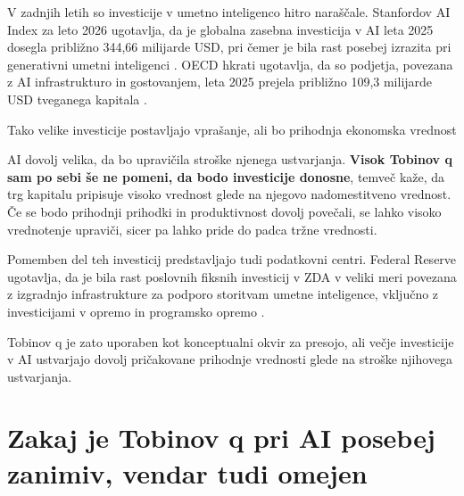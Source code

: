 \documentclass[12pt,a4paper]{article}
\begin{document}
V zadnjih letih so investicije v umetno inteligenco hitro naraščale. Stanfordov AI Index 
za leto 2026 ugotavlja, da je globalna zasebna investicija v AI leta 2025 dosegla približno 
344,66 milijarde USD, pri čemer je bila rast posebej izrazita pri generativni umetni 
inteligenci \citep{StanfordAIIndex2026}. OECD hkrati ugotavlja, da so podjetja, povezana 
z AI infrastrukturo in gostovanjem, leta 2025 prejela približno 109,3 milijarde USD 
tveganega kapitala \citep{OECD2026}.

Tako velike investicije postavljajo vprašanje, ali bo prihodnja ekonomska vrednost 

AI dovolj velika, da bo upravičila stroške njenega ustvarjanja. \textbf{Visok Tobinov q sam po sebi še ne pomeni, da bodo investicije donosne}, temveč kaže, da trg kapitalu 
pripisuje visoko vrednost glede na njegovo nadomestitveno vrednost. Če se bodo prihodnji 
prihodki in produktivnost dovolj povečali, se lahko visoko vrednotenje upraviči, sicer pa 
lahko pride do padca tržne vrednosti.

Pomemben del teh investicij predstavljajo tudi podatkovni centri. Federal Reserve 
ugotavlja, da je bila rast poslovnih fiksnih investicij v ZDA v veliki meri povezana 
z izgradnjo infrastrukture za podporo storitvam umetne inteligence, vključno z 
investicijami v opremo in programsko opremo \citep{FederalReserve2026}.

Tobinov q je zato uporaben kot konceptualni okvir za presojo, ali večje investicije v 
AI ustvarjajo dovolj pričakovane prihodnje vrednosti glede na stroške njihovega 
ustvarjanja.






\section{Zakaj je Tobinov q pri AI posebej zanimiv, vendar tudi omejen}

\end{document}
